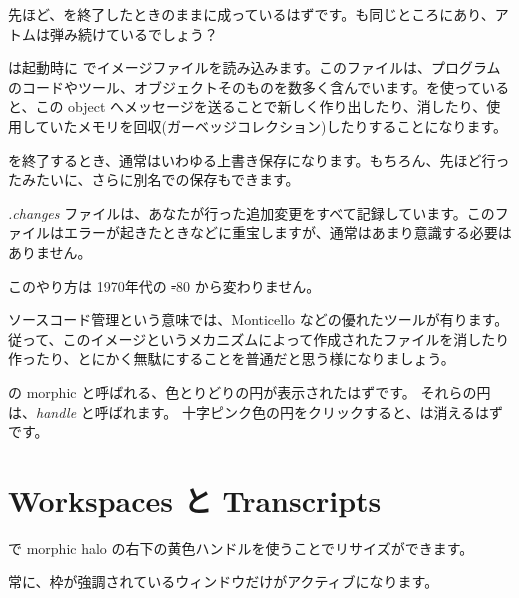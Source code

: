 \documentclass[a4paper,10pt,twoside]{book}
\begin{document}

先ほど、\pharo を終了したときのままに成っているはずです。\bam も同じところにあり、アトムは弾み続けているでしょう？

\pharo は起動時に でイメージファイルを読み込みます。このファイルは、プログラムのコードやツール、オブジェクトそのものを数多く含んでいます。\pharo を使っていると、この object へメッセージを送ることで新しく作り出したり、消したり、使用していたメモリを回収(ガーベッジコレクション)したりすることになります。

\pharo を終了するとき、通常はいわゆる上書き保存になります。もちろん、先ほど行ったみたいに、さらに別名での保存もできます。

\emph{.changes} ファイルは、あなたが行った追加変更をすべて記録しています。このファイルはエラーが起きたときなどに重宝しますが、通常はあまり意識する必要はありません。

このやり方は 1970年代の \st-80 から変わりません。

ソースコード管理という意味では、Monticello などの優れたツールが有ります。従って、このイメージというメカニズムによって作成されたファイルを消したり作ったり、とにかく無駄にすることを普通だと思う様になりましょう。

\bam の morphic  と呼ばれる、色とりどりの円が表示されたはずです。
それらの円は、\emph{handle} と呼ばれます。
十字ピンク色の円をクリックすると、\bam は消えるはずです。

\section{Workspaces と Transcripts}


\metaclick で morphic halo の右下の黄色ハンドルを使うことでリサイズができます。

常に、枠が強調されているウィンドウだけがアクティブになります。
\end{document}
